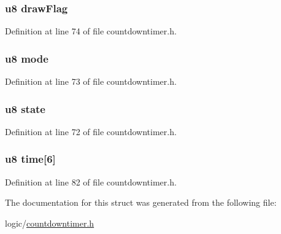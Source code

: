 \hypertarget{structcdtimer_a3e8544bc695992c4f9df78288018341b}{
\subsubsection[{draw\-Flag}]{\setlength{\rightskip}{0pt plus 5cm}u8 {\bf draw\-Flag}}}\label{structcdtimer_a3e8544bc695992c4f9df78288018341b}


\-Definition at line 74 of file countdowntimer.\-h.

\hypertarget{structcdtimer_a7cea6ae40aa46b41e3806213a39718c6}{
\subsubsection[{mode}]{\setlength{\rightskip}{0pt plus 5cm}u8 {\bf mode}}}\label{structcdtimer_a7cea6ae40aa46b41e3806213a39718c6}


\-Definition at line 73 of file countdowntimer.\-h.

\hypertarget{structcdtimer_ad0bc4e4e6e6ffc52d9079b73afd73887}{
\subsubsection[{state}]{\setlength{\rightskip}{0pt plus 5cm}u8 {\bf state}}}\label{structcdtimer_ad0bc4e4e6e6ffc52d9079b73afd73887}


\-Definition at line 72 of file countdowntimer.\-h.

\hypertarget{structcdtimer_a423004d470464f425592df7a003cd838}{
\subsubsection[{time}]{\setlength{\rightskip}{0pt plus 5cm}u8 {\bf time}\mbox{[}6\mbox{]}}}\label{structcdtimer_a423004d470464f425592df7a003cd838}


\-Definition at line 82 of file countdowntimer.\-h.



\-The documentation for this struct was generated from the following file\-:\begin{DoxyCompactItemize}
\item 
logic/\hyperlink{countdowntimer_8h}{countdowntimer.\-h}\end{DoxyCompactItemize}
